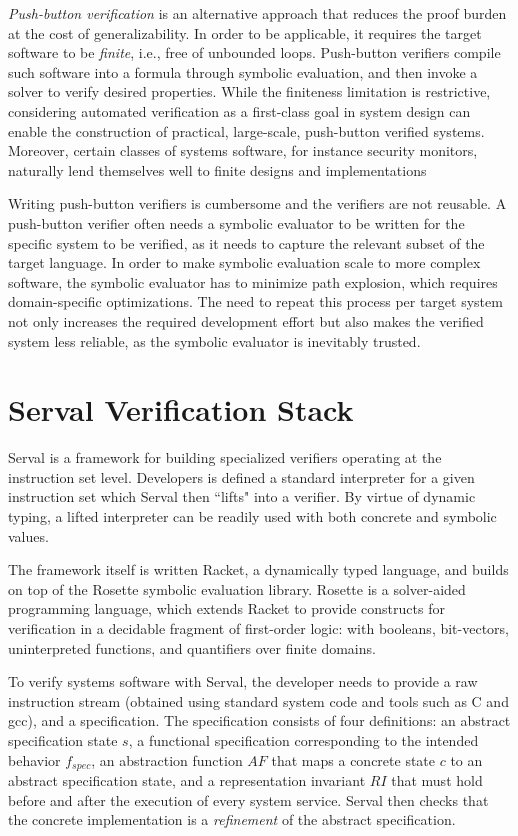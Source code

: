 \documentclass[11pt,a4paper]{article}
\newcommand{\serval}{Serval\xspace}
\newcommand{\racket}{\textsf{Racket}\xspace}
\newcommand{\rosette}{\textsf{Rosette}\xspace}
\newcommand{\clang}{\textsf{C}\xspace}
\newcommand{\gcc}{\textsf{gcc}\xspace}
\begin{document}
\textit{Push-button verification} is an alternative approach that reduces the proof
burden at the cost of generalizability. 
In order to be applicable, it requires the target software to be
\textit{finite}, i.e., free of unbounded loops. 
Push-button verifiers compile such software into a formula through symbolic
evaluation, and then invoke a solver to verify desired properties. 
While the finiteness limitation is restrictive, considering automated verification as a
first-class goal in system design can enable the construction of practical,
large-scale, push-button verified systems.
Moreover, certain classes of systems software, for instance security monitors,
naturally lend themselves well to finite designs and implementations

Writing push-button verifiers is cumbersome and the verifiers are not reusable.
A push-button verifier often needs a symbolic evaluator to be written for the
specific system to be verified, as it needs to capture the relevant subset of
the target language. In order to make symbolic evaluation scale to more complex
software, the symbolic evaluator has to minimize path explosion, which requires
domain-specific optimizations. The need to repeat this process per target system
not only increases the required development effort but also makes the verified
system less reliable, as the symbolic evaluator is inevitably trusted.




\section{\serval Verification Stack} 
\label{serval}

\serval is a framework for building specialized verifiers operating at the
instruction set level. Developers is defined a standard interpreter for a given
instruction set which \serval then ``lifts" into a verifier. 
By virtue of dynamic typing, a lifted interpreter can be readily used with both concrete and symbolic values.

The framework itself is written \racket{}, a dynamically
typed language, and builds on top of the \rosette{} symbolic evaluation library.
%
\rosette{} is a solver-aided programming language, which extends Racket to provide
constructs for verification in a decidable fragment of first-order logic: with
booleans, bit-vectors, uninterpreted functions, and quantifiers over finite
domains.
%


To verify systems software with \serval, the developer needs to provide a raw
instruction stream (obtained using standard system code and tools such as \clang{} and
\gcc), and a specification.
%
The specification consists of four definitions: an abstract specification state $s$, a functional
specification corresponding to the intended behavior $f_{spec}$, an abstraction
function $AF$ that maps a concrete state $c$ to an abstract specification state, and a
representation invariant $RI$ that must hold before and after the execution of every system service.
\serval then checks that the concrete implementation is a \textit{refinement} of
the abstract specification.
\end{document}
